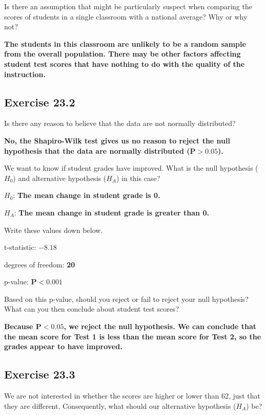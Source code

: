 \documentclass[
  openany]{krantz}
\begin{document}
Is there an assumption that might be particularly suspect when comparing the scores of students in a single classroom with a national average? Why or why not?

\textbf{The students in this classroom are unlikely to be a random sample from the overall population. There may be other factors affecting student test scores that have nothing to do with the quality of the instruction.}

\hypertarget{exercise-23.2}{%
\subsection{Exercise 23.2}\label{exercise-23.2}}

Is there any reason to believe that the data are not normally distributed?

\textbf{No, the Shapiro-Wilk test gives us no reason to reject the null hypothesis that the data are normally distributed (\(\mathbf{P > 0.05}\)).}

We want to know if student grades have improved. What is the null hypothesis (\(H_{0}\)) and alternative hypothesis (\(H_{A}\)) in this case?

\(H_{0}\): \textbf{The mean change in student grade is 0.}

\(H_{A}\): \textbf{The mean change in student grade is greater than 0.}

Write these values down below.

t-statistic: \textbf{\(\mathbf{-8.18}\)}

degrees of freedom: \textbf{20}

p-value: \textbf{\(\mathbf{P < 0.001}\)}

Based on this p-value, should you reject or fail to reject your null hypothesis? What can you then conclude about student test scores?

\textbf{Because \(\mathbf{P < 0.05}\), we reject the null hypothesis. We can conclude that the mean score for Test 1 is less than the mean score for Test 2, so the grades appear to have improved.}

\hypertarget{exercise-23.3}{%
\subsection{Exercise 23.3}\label{exercise-23.3}}

We are not interested in whether the scores are higher or lower than 62, just that
they are different. Consequently, what should our alternative hypothesis (\(H_{A}\)) be?
\end{document}

